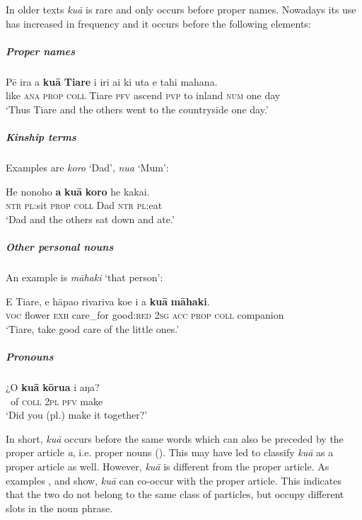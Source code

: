 In older texts \textit{kuā} is rare and only occurs before proper names. Nowadays its use has increased in frequency and it occurs before the following elements:

\subparagraph{Proper names}

\ea\label{ex:5.8}
\gll Pē ira a \textbf{kuā} \textbf{Tiare} i iri ai ki {\ꞌ}uta e tahi mahana. \\
like \textsc{ana} \textsc{prop} \textsc{coll} Tiare \textsc{pfv} ascend \textsc{pvp} to inland \textsc{num} one day \\

\glt
‘Thus Tiare and the others went to the countryside one day.’ \textstyleExampleref{[R151.048]} 
\z

\subparagraph{Kinship terms} Examples are \textit{koro} ‘Dad’, \textit{nua} ‘Mum’:

\ea\label{ex:5.9}
\gll He nonoho \textbf{a} \textbf{kuā} \textbf{koro} he kakai. \\
\textsc{ntr} \textsc{pl}:sit \textsc{prop} \textsc{coll} Dad \textsc{ntr} \textsc{pl}:eat \\

\glt
‘Dad and the others sat down and ate.’ \textstyleExampleref{[R333.538]} 
\z

\subparagraph{Other personal nouns} An example is \textit{māhaki} ‘that person’:

\ea\label{ex:5.10}
\gll E Tiare, e hāpa{\ꞌ}o rivariva koe i a \textbf{kuā} \textbf{māhaki}. \\
\textsc{voc} flower \textsc{exh} care\_for good:\textsc{red} \textsc{2sg} \textsc{acc} \textsc{prop} \textsc{coll} companion \\

\glt
‘Tiare, take good care of the little ones.’ \textstyleExampleref{[R496.015]} 
\z

\subparagraph{Pronouns}

\ea\label{ex:5.11}
\gll ¿O \textbf{kuā} \textbf{kōrua} i aŋa? \\
~of \textsc{coll} \textsc{2pl} \textsc{pfv} make \\

\glt
‘Did you (pl.) make it together?’ \textstyleExampleref{[R415.808]} 
\z

In short, \textit{kuā} occurs before the same words which can also be preceded by the proper article \textit{a}, i.e. proper nouns (). This may have led \citet[474]{DuFeu1987} to classify \textit{kuā} as a proper article as well. However, \textit{kuā} is different from the proper article. As examples ,  and  show, \textit{kuā} can co-occur with the proper article. This indicates that the two do not belong to the same class of particles, but occupy different slots in the noun phrase.

